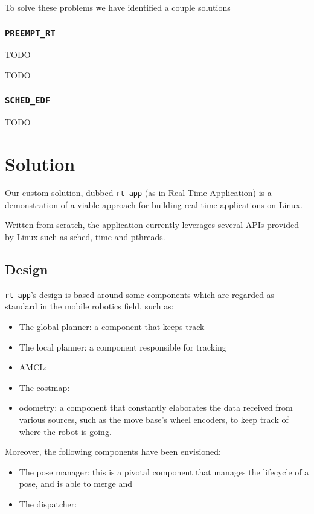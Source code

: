 \documentclass[a4paper,12pt]{report}
\begin{document}
To solve these problems we have identified a couple solutions

\subsection{\texttt{PREEMPT\_RT}}

TODO


TODO

\subsection{\texttt{SCHED\_EDF}}

TODO
\newpage
\chapter{Solution}

Our custom solution, dubbed \texttt{rt-app} (as in Real-Time
Application) is a demonstration of a viable approach for building
real-time applications on Linux. 

Written from scratch, the application currently leverages several APIs provided
by Linux such as sched, time and pthreads.

\section{Design}

\texttt{rt-app}'s design is based around some components which are
regarded as standard in the mobile robotics field, such as:
\begin{itemize}
\item The global planner: a component that keeps track
\item The local planner: a component responsible for tracking 
\item AMCL:
\item The costmap:
\item odometry: a component that constantly elaborates the data
  received from various sources, such as the move base's wheel
  encoders, to keep track of where the robot is going. 
\end{itemize}

Moreover, the following components have been envisioned:
\begin{itemize}
\item The pose manager: this is a pivotal component that manages the
  lifecycle of a pose, and is able to merge and 
\item The dispatcher:
\end{itemize}
\end{document}
